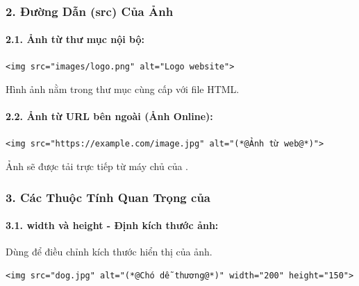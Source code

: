 \subsubsection{2. Đường Dẫn (src) Của Ảnh}

\paragraph{2.1. Ảnh từ thư mục nội bộ:}
\begin{codeWindow}
\begin{lstlisting}[language=HTML5]
<img src="images/logo.png" alt="Logo website">
\end{lstlisting}
\end{codeWindow}

Hình ảnh  nằm trong thư mục  cùng cấp với file HTML.

\paragraph{2.2. Ảnh từ URL bên ngoài (Ảnh Online):}
\begin{codeWindow}
\begin{lstlisting}[language=HTML5]
<img src="https://example.com/image.jpg" alt="(*@Ảnh từ web@*)">
\end{lstlisting}
\end{codeWindow}

Ảnh sẽ được tải trực tiếp từ máy chủ của .

\subsubsection{3. Các Thuộc Tính Quan Trọng của }

\paragraph{3.1. width và height - Định kích thước ảnh:}
Dùng để điều chỉnh kích thước hiển thị của ảnh.

\begin{codeWindow}
\begin{lstlisting}[language=HTML5]
<img src="dog.jpg" alt="(*@Chó dễ thương@*)" width="200" height="150">
\end{lstlisting}
\end{codeWindow}

